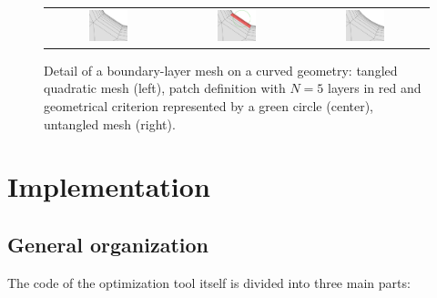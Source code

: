 \documentclass[12pt,a4paper,a4wide]{article}
\begin{document}
\begin{figure}
\begin{center}
\begin{tabular}{ccc}
\includegraphics[width=0.33\textwidth]{patches/patch_tangled}&
\includegraphics[width=0.33\textwidth]{patches/patch_def}&
\includegraphics[width=0.33\textwidth]{patches/patch_untangled}
\end{tabular}
\end{center}
\caption{Detail of a boundary-layer mesh on a curved geometry:
tangled quadratic mesh (left), patch definition with $N=5$ layers
in red and geometrical criterion represented by a green circle
(center), untangled mesh (right).
\label{fig:patches}}
\end{figure}


\section{Implementation}


\subsection{General organization}\label{sec:gen-org}

The code of the optimization tool itself is divided into three main
parts:
\end{document}
